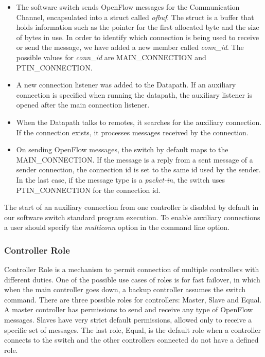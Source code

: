    \begin{itemize}
    \item The software switch sends OpenFlow messages for the Communication Channel, encapsulated into a struct called \textit{ofbuf}. The struct is a buffer that holds information such as the pointer for the first allocated byte and the size of bytes in use. In order to identify which connection is being used to receive or send the message, we have added a new member called \textit{conn_id}. The possible values for \textit{conn_id} are MAIN_CONNECTION and PTIN_CONNECTION.  
    
    \item A new connection listener was added to the Datapath. If an auxiliary connection is specified when running the datapath, the auxiliary listener is opened after the main connection listener.
    
    \item When the Datapath talks to remotes, it searches for the auxiliary connection. If the connection exists, it processes messages received by the connection.
    
    \item On sending OpenFlow messages, the switch by default maps to the MAIN_CONNECTION. If the message is a reply from  a sent message of a sender connection, the connection id is set to the same id used by the sender. In the last case, if the message type is a \textit{packet-in}, the switch uses PTIN_CONNECTION for the connection id. 
    
    \end{itemize}
    
    The start of an auxiliary connection from one controller is disabled by default in our software switch standard program execution. To enable auxiliary connections a user should specify the \textit{multiconn} option in the command line option.   

    \subsubsection{Controller Role}

    Controller Role is a mechanism to permit connection of multiple controllers with different duties. One of the possible use cases of roles is for fast failover, in which when the main controller goes down, a backup controller assumes the switch command. There are three possible roles for controllers: Master, Slave and Equal. A master controller has permissions to send and receive any type of OpenFlow messages. Slaves have very strict default permissions, allowed only to receive a specific set of messages. The last role, Equal, is the default role when a controller connects to the switch and the other controllers connected do not have a defined role.
    
